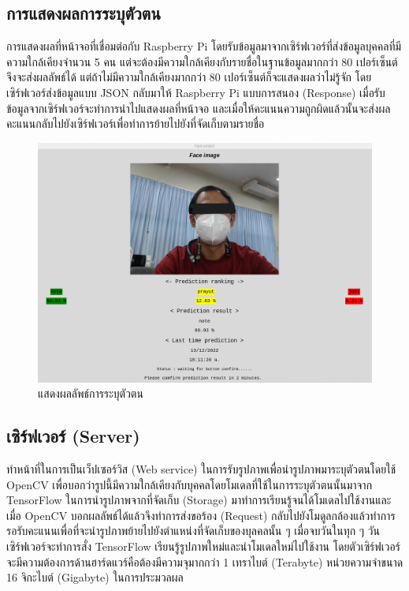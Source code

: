 \subsection{การแสดงผลการระบุตัวตน}
การแสดงผลที่หน้าจอที่เชื่อมต่อกับ Raspberry Pi โดยรับข้อมูลมาจากเซิร์ฟเวอร์ที่ส่งข้อมูลบุคคลที่มีความใกล้เคียงจำนวน 5 คน 
แต่จะต้องมีความใกล้เคียงกับรายชื่อในฐานข้อมูลมากกว่า 80 เปอร์เซ็นต์จึงจะส่งผลลัพธ์ได้ แต่ถ้าไม่มีความใกล้เคียงมากกว่า 80 เปอร์เซ็นต์ก็จะแสดงผลว่าไม่รู้จัก 
โดยเซิร์ฟเวอร์ส่งข้อมูลแบบ JSON กลับมาให้ Raspberry Pi แบบการสนอง (Response) เมื่อรับข้อมูลจากเซิร์ฟเวอร์จะทำการนำไปแสดงผลที่หน้าจอ 
และเมื่อให้คะแนนความถูกผิดแล้วนั้นจะส่งผลคะแนนกลับไปยังเซิร์ฟเวอร์เพื่อทำการย้ายไปยังที่จัดเก็บตามรายชื่อ \\

\begin{figure}[h]
  \begin{center}
    \includegraphics[scale=.45]{pic/result_page_blind.png}
  \caption[Poem]{แสดงผลลัพธ์การระบุตัวตน}
  \end{center}
  \label{fig:predict_result}
\end{figure}
\newpage

\subsection{เซิร์ฟเวอร์ (Server)}
ทำหน้าที่ในการเป็นเว็ปเซอร์วิส (Web service) ในการรับรูปภาพเพื่อนำรูปภาพมาระบุตัวตนโดยใช้ OpenCV
เพื่อบอกว่ารูปนี้มีความใกล้เคียงกับบุคคลโดยโมเดลที่ใช้ในการระบุตัวตนนั้นมาจาก TensorFlow ในการนำรูปภาพจากที่จัดเก็บ (Storage) 
มาทำการเรียนรู้จนได้โมเดลไปใช้งานและเมื่อ OpenCV บอกผลลัพธ์ได้แล้วจึงทำการส่งขอร้อง (Request) 
กลับไปยังโมดูลกล้องแล้วทำการรอรับคะแนนเพื่อที่จะนำรูปภาพย้ายไปยังตำแหน่งที่จัดเก็บของบุลคลนั้น ๆ เมื่อจบวันในทุก ๆ 
วันเซิร์ฟเวอร์จะทำการสั่ง TensorFlow เรียนรู้รูปภาพใหม่และนำโมเดลใหม่ไปใช้งาน โดยตัวเซิร์ฟเวอร์จะมีความต้องการด้านฮาร์ดแวร์คือต้องมีความจุมากกว่า 1 เทราไบต์  (Terabyte) 
หน่วยความจำขนาด 16 จิกะไบต์ (Gigabyte) ในการประมวลผล

